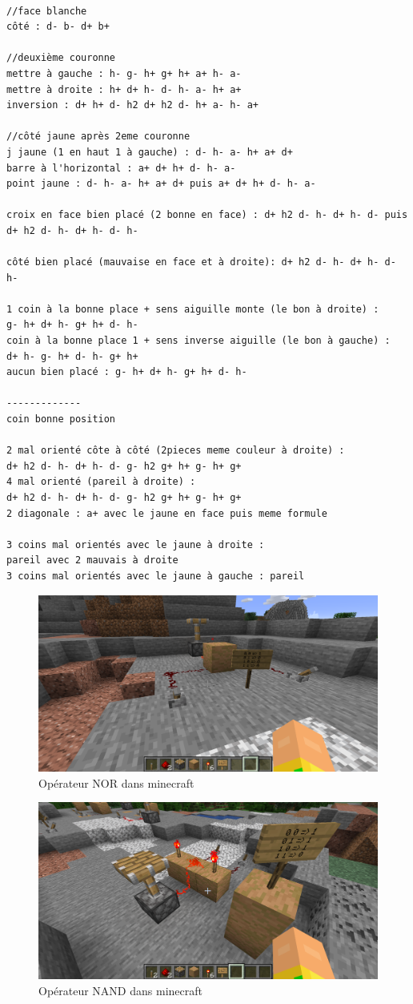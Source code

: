 \begin{lstlisting}[frame=single]

//face blanche
côté : d- b- d+ b+

//deuxième couronne
mettre à gauche : h- g- h+ g+ h+ a+ h- a-
mettre à droite : h+ d+ h- d- h- a- h+ a+
inversion : d+ h+ d- h2 d+ h2 d- h+ a- h- a+ 

//côté jaune après 2eme couronne
j jaune (1 en haut 1 à gauche) : d- h- a- h+ a+ d+
barre à l'horizontal : a+ d+ h+ d- h- a-
point jaune : d- h- a- h+ a+ d+ puis a+ d+ h+ d- h- a-

croix en face bien placé (2 bonne en face) : d+ h2 d- h- d+ h- d- puis
d+ h2 d- h- d+ h- d- h-

côté bien placé (mauvaise en face et à droite): d+ h2 d- h- d+ h- d- h-

1 coin à la bonne place + sens aiguille monte (le bon à droite) :
g- h+ d+ h- g+ h+ d- h-
coin à la bonne place 1 + sens inverse aiguille (le bon à gauche) : 
d+ h- g- h+ d- h- g+ h+
aucun bien placé : g- h+ d+ h- g+ h+ d- h-

-------------
coin bonne position 

2 mal orienté côte à côté (2pieces meme couleur à droite) : 
d+ h2 d- h- d+ h- d- g- h2 g+ h+ g- h+ g+
4 mal orienté (pareil à droite) : 
d+ h2 d- h- d+ h- d- g- h2 g+ h+ g- h+ g+
2 diagonale : a+ avec le jaune en face puis meme formule

3 coins mal orientés avec le jaune à droite : 
pareil avec 2 mauvais à droite
3 coins mal orientés avec le jaune à gauche : pareil

\end{lstlisting}

\newpage

\begin{figure}[!htb]
  \centering
  \includegraphics[width=120mm,scale=0.5]{images/minecraft6.png}
  \caption{Opérateur NOR dans minecraft}
  \label{fig:boat1}
\end{figure}

\begin{figure}[!htb]
  \centering
  \includegraphics[width=120mm,scale=0.5]{images/minecraft7.png}
  \caption{Opérateur NAND dans minecraft}
  \label{fig:boat1}
\end{figure}